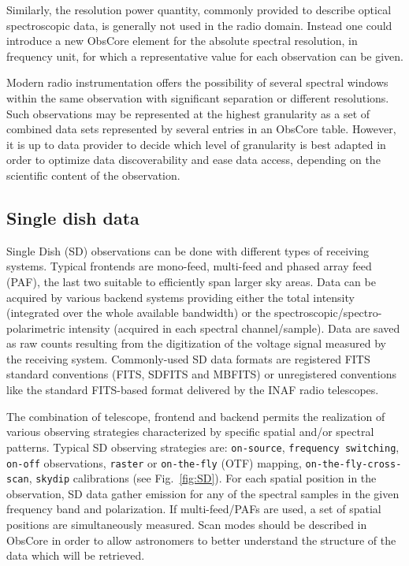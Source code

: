\documentclass[11pt,a4paper]{ivoa}
\begin{document}
Similarly, the resolution power quantity, commonly provided to describe optical spectroscopic data, is generally not used in the radio domain.
Instead one could introduce a new ObsCore element for the absolute spectral resolution, in frequency unit, for which a representative value for each observation can be given.

Modern radio instrumentation offers the possibility of several  spectral windows within the same observation with significant separation or different resolutions.
Such observations may be represented at the highest granularity as  a set of combined data sets represented by several entries in an ObsCore table.
However, it is up to data provider to decide which level of granularity is best adapted in order to optimize data discoverability and ease data access, 
depending on the scientific content of the observation.

\subsection{Single dish data}
\label{sec:sd}

Single Dish (SD) observations can be done with different types of receiving systems. Typical frontends are mono-feed, multi-feed and phased array feed (PAF), the last two suitable to efficiently span larger sky areas.
Data can be acquired by various backend systems providing either the total intensity (integrated over the whole available bandwidth) or the spectroscopic/spectro-polarimetric intensity (acquired in each spectral channel/sample).
Data are saved as raw counts resulting from the digitization of the voltage signal measured by the receiving system.
Commonly-used SD data formats are registered FITS standard conventions (FITS, SDFITS and MBFITS) or unregistered conventions like the standard FITS-based format delivered by the INAF radio telescopes.

The combination of telescope, frontend and backend permits the realization of various observing strategies characterized by specific spatial and/or spectral patterns.
Typical SD observing strategies are: \texttt{on-source}, \texttt{frequency switching}, \texttt{on-off} observations, \texttt{raster} or \texttt{on-the-fly} (OTF) mapping, \texttt{on-the-fly-cross-scan}, \texttt{skydip} calibrations (see Fig.~\ref{fig:SD}). For each spatial position in the observation, SD data gather emission for any of the spectral samples in the given frequency band and polarization.
If multi-feed/PAFs are used, a set of spatial positions are simultaneously measured. Scan modes should be described in ObsCore in order to allow astronomers to better understand the structure of the data which will be retrieved.
\end{document}
